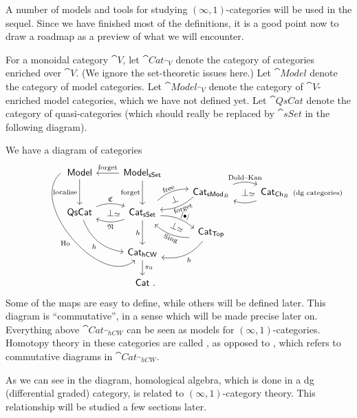 A number of models and tools for studying $(\infty,1)$-categories 
will be used in the sequel. 
Since we have finished most of the definitions,
it is a good point now to draw a roadmap
as a preview of what we will encounter.

For a monoidal category $\cat V$,
let $\cat{Cat}_{\cat V}$ denote the category of categories enriched over $\cat V$.
(We ignore the set-theoretic issues here.)
Let $\cat{Model}$ denote the category of model categories.
Let $\cat{Model}_{\cat V}$ denote the category of $\cat V$-enriched model categories,
which we have not defined yet.
Let $\cat{QsCat}$ denote the category of quasi-categories
(which should really be replaced by $\cat{sSet}$ in the following diagram).

We have a diagram of categories 
\[\begin{tikzcd}[row sep=1ex]
    \cat{Model} \ar[dd,"\text{localise}"']
    \ar[ddddr,start anchor={[xshift=-.5ex]west},bend right=90,"\Ho"'] &
    \cat{Model}_{\cat{sSet}} \ar[l,"\text{forget}"'] 
    \ar[dd,"\text{forget}"'] \\ 
%
    && \cat{Cat}_{\cat{sMod}_R} \ar[r,bend left=20,"\text{Dold--Kan}"]
    \ar[r,phantom,"\bot\rlap{$\scriptstyle\simeq$}"]
    \ar[dl,bend left=20,start anchor={[xshift=-1.5ex,yshift=1ex]},
    end anchor={[yshift=1ex]},pos=.7,"\text{forget}" {rotate=20,inner sep=1pt}] &
    \rlap{$\cat{Cat}_{\cat{Ch}_R}$\scriptsize\enspace(dg categories)}
    \phantom{\cat{Cat}_{\cat{sMod}_R}} \ar[l,bend left=20] \\
%
    \cat{QsCat} \ar[r,bend left=20,"\mathfrak C"]
    \ar[r,phantom,"\bot\rlap{$\scriptstyle\simeq$}"] \ar[ddr,bend right,"h"'] &
    \cat{Cat}_{\cat{sSet}} \ar[l,bend left=20,"\mathfrak N"] \ar[dd,"h"']
    \ar[ur,bend left=20,start anchor={[xshift=1ex,yshift=1ex]},
    end anchor={[yshift=.5ex]},pos=.7,"\text{free}" rotate=20]
    \ar[ur,phantom,yshift=1ex,"\bot" rotate=20]
    \ar[dr,bend left=20,start anchor={[yshift=-1ex]},
    end anchor={[xshift=-1.5ex,yshift=-1ex]},pos=.5,"|\bullet|" {rotate=-20,inner sep=1pt}]
    \ar[dr,phantom,yshift=-1ex,"\bot\scriptstyle\simeq" rotate=-20] \\
    &&\cat{Cat}_{\cat{Top}} \ar[dl,bend left,"h"]
    \ar[ul,bend left=20,start anchor={[xshift=-1ex,yshift=-1ex]},
    end anchor={[xshift=.5ex,yshift=-1ex]},pos=.2,"\operatorname{Sing}" rotate=-20]\\
%
    &\cat{Cat}_{\cat{hCW}} \ar[dd,"\pi_0"] \\ \  \\
    &\cat{Cat}\rlap{\ .}
\end{tikzcd}\hspace{3em}\]
Some of the maps are easy to define, while others will be defined later.
This diagram is ``commutative'', in a sense which will be made precise later on.
Everything above $\cat{Cat}_{\cat{hCW}}$ can be seen as
models for $(\infty,1)$-categories.
Homotopy theory in these categories are called ,
as opposed to , 
which refers to commutative diagrams in $\cat{Cat}_{\cat{hCW}}$.

As we can see in the diagram, homological algebra, which is done in a dg (differential graded) category,
is related to $(\infty,1)$-category theory.
This relationship will be studied a few sections later.

